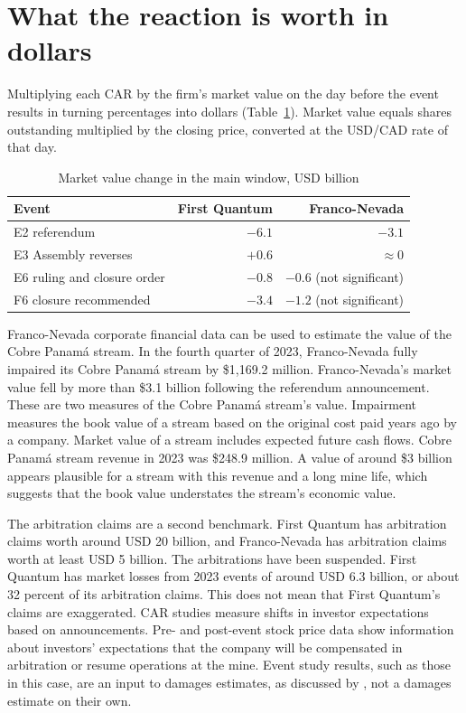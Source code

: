 \documentclass[11pt]{article}
\begin{document}
\section{What the reaction is worth in dollars}

Multiplying each CAR by the firm's market value on the day before the event results in turning percentages into dollars (Table~\ref{tab:dollars}). Market value equals shares outstanding multiplied by the closing price, converted at the USD/CAD rate of that day.

\begin{table}[h]
\centering
\caption{Market value change in the main window, USD billion}
\label{tab:dollars}
\small
\begin{tabular}{l r r}
\toprule
Event & First Quantum & Franco-Nevada \\
\midrule
E2 referendum & $-6.1$ & $-3.1$ \\
E3 Assembly reverses & $+0.6$ & $\approx 0$ \\
E6 ruling and closure order & $-0.8$ & $-0.6$ (not significant) \\
F6 closure recommended & $-3.4$ & $-1.2$ (not significant) \\
\bottomrule
\end{tabular}
\end{table}

Franco-Nevada corporate financial data can be used to estimate the value of the Cobre Panamá stream. In the fourth quarter of 2023, Franco-Nevada fully impaired its Cobre Panamá stream by \$1,169.2 million. Franco-Nevada's market value fell by more than \$3.1 billion following the referendum announcement. These are two measures of the Cobre Panamá stream's value. Impairment measures the book value of a stream based on the original cost paid years ago by a company. Market value of a stream includes expected future cash flows. Cobre Panamá stream revenue in 2023 was \$248.9 million. A value of around \$3 billion appears plausible for a stream with this revenue and a long mine life, which suggests that the book value understates the stream's economic value.

The arbitration claims are a second benchmark. First Quantum has arbitration claims worth around USD 20 billion, and Franco-Nevada has arbitration claims worth at least USD 5 billion. The arbitrations have been suspended. First Quantum has market losses from 2023 events of around USD 6.3 billion, or about 32 percent of its arbitration claims. This does not mean that First Quantum's claims are exaggerated. CAR studies measure shifts in investor expectations based on announcements. Pre- and post-event stock price data show information about investors' expectations that the company will be compensated in arbitration or resume operations at the mine. Event study results, such as those in this case, are an input to damages estimates, as discussed by \citet{dellepiane2011}, not a damages estimate on their own.
\end{document}
